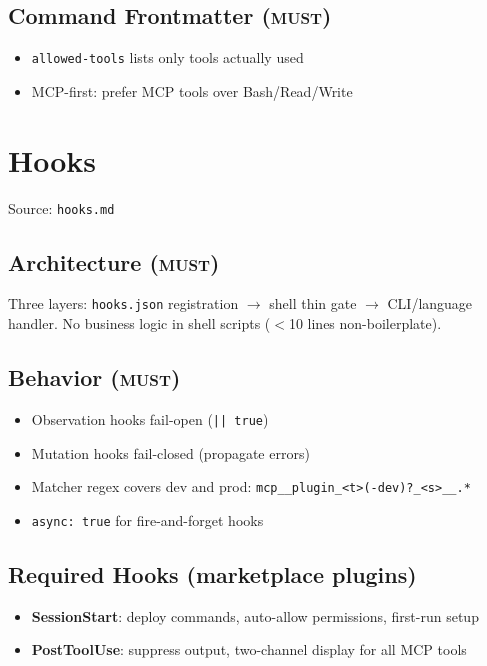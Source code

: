 \documentclass[a4paper,10pt]{article}
\newcommand{\must}{\textsc{must}}
\begin{document}
\subsection{Command Frontmatter (\must)}
\begin{itemize}
  \item \texttt{allowed-tools} lists only tools actually used
  \item MCP-first: prefer MCP tools over Bash/Read/Write
\end{itemize}

\section{Hooks}
\label{sec:hooks}
Source: \texttt{hooks.md}

\subsection{Architecture (\must)}
Three layers: \texttt{hooks.json} registration $\to$ shell thin gate $\to$
CLI/language handler. No business logic in shell scripts ($<$10 lines
non-boilerplate).

\subsection{Behavior (\must)}
\begin{itemize}
  \item Observation hooks fail-open (\texttt{|| true})
  \item Mutation hooks fail-closed (propagate errors)
  \item Matcher regex covers dev and prod: \texttt{mcp\_\_plugin\_<t>(-dev)?\_<s>\_\_.*}
  \item \texttt{async: true} for fire-and-forget hooks
\end{itemize}

\subsection{Required Hooks (marketplace plugins)}
\begin{itemize}
  \item \textbf{SessionStart}: deploy commands, auto-allow permissions, first-run setup
  \item \textbf{PostToolUse}: suppress output, two-channel display for all MCP tools
\end{itemize}
\end{document}
